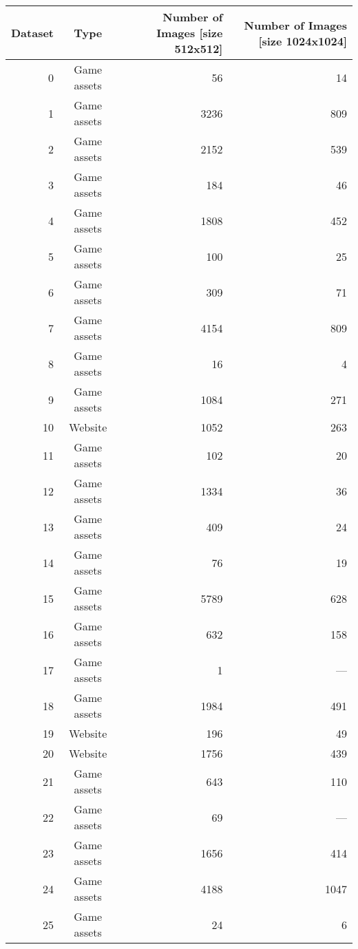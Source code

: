     \begin{table}[H]
        \centering
        \begin{adjustbox}{width=0.8\textwidth}
          \begin{tabular}{|r|c|r|r|}
              \hline
              Dataset & Type & Number of Images [size 512x512] & Number of Images [size 1024x1024] \\
              \hline
              0 & Game assets & 56 & 14 \\
              1 & Game assets & 3236 & 809 \\
              2 & Game assets & 2152 & 539 \\
              3 & Game assets & 184 & 46 \\
              4 & Game assets & 1808 & 452 \\
              5 & Game assets & 100 & 25 \\
              6 & Game assets & 309 & 71 \\
              7 & Game assets & 4154 & 809 \\
              8 & Game assets & 16 & 4 \\
              9 & Game assets & 1084 & 271 \\
              10 & Website & 1052 & 263 \\
              11 & Game assets & 102 & 20 \\
              12 & Game assets & 1334 & 36 \\
              13 & Game assets & 409 & 24 \\
              14 & Game assets & 76 & 19 \\
              15 & Game assets & 5789 & 628 \\
              16 & Game assets & 632 & 158 \\
              17 & Game assets & 1 & --- \\
              18 & Game assets & 1984 & 491 \\
              19 & Website & 196 & 49 \\
              20 & Website & 1756 & 439 \\
              21 & Game assets & 643 & 110 \\
              22 & Game assets & 69 & --- \\
              23 & Game assets & 1656 & 414 \\
              24 & Game assets & 4188 & 1047 \\
              25 & Game assets & 24 & 6 \\

\end{tabular}
\end{adjustbox}
\end{table}
